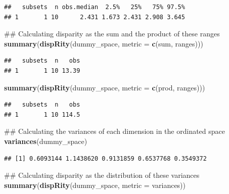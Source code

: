 \documentclass[]{book}
\newenvironment{Shaded}{\begin{snugshade}}{\end{snugshade}}
\newcommand{\KeywordTok}[1]{\textcolor[rgb]{0.13,0.29,0.53}{\textbf{#1}}}
\newcommand{\DataTypeTok}[1]{\textcolor[rgb]{0.13,0.29,0.53}{#1}}
\newcommand{\NormalTok}[1]{#1}
\theoremstyle{definition}
\theoremstyle{definition}
\theoremstyle{definition}
\theoremstyle{remark}
\begin{document}
\begin{verbatim}
##   subsets  n obs.median  2.5%   25%   75% 97.5%
## 1       1 10      2.431 1.673 2.431 2.908 3.645
\end{verbatim}

\begin{Shaded}
\begin{Highlighting}[]
\NormalTok{## Calculating disparity as the sum and the product of these ranges}
\KeywordTok{summary}\NormalTok{(}\KeywordTok{dispRity}\NormalTok{(dummy_space, }\DataTypeTok{metric =} \KeywordTok{c}\NormalTok{(sum, ranges)))}
\end{Highlighting}
\end{Shaded}

\begin{verbatim}
##   subsets  n   obs
## 1       1 10 13.39
\end{verbatim}

\begin{Shaded}
\begin{Highlighting}[]
\KeywordTok{summary}\NormalTok{(}\KeywordTok{dispRity}\NormalTok{(dummy_space, }\DataTypeTok{metric =} \KeywordTok{c}\NormalTok{(prod, ranges)))}
\end{Highlighting}
\end{Shaded}

\begin{verbatim}
##   subsets  n   obs
## 1       1 10 114.5
\end{verbatim}

\begin{Shaded}
\begin{Highlighting}[]
\NormalTok{## Calculating the variances of each dimension in the ordinated space}
\KeywordTok{variances}\NormalTok{(dummy_space)}
\end{Highlighting}
\end{Shaded}

\begin{verbatim}
## [1] 0.6093144 1.1438620 0.9131859 0.6537768 0.3549372
\end{verbatim}

\begin{Shaded}
\begin{Highlighting}[]
\NormalTok{## Calculating disparity as the distribution of these variances}
\KeywordTok{summary}\NormalTok{(}\KeywordTok{dispRity}\NormalTok{(dummy_space, }\DataTypeTok{metric =}\NormalTok{ variances))}
\end{Highlighting}
\end{Shaded}
\end{document}
